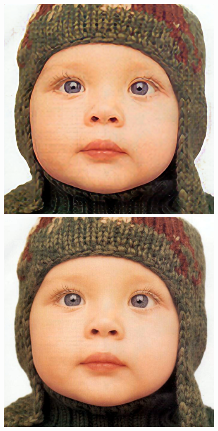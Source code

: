 \documentclass[runningheads]{llncs}
\begin{document}
\begin{figure}[t]
  \includegraphics[width=\mywidth]{set5_1_feat.png} \\
  \includegraphics[trim={100px 280px 300px 160px},width=\mywidth,clip]{set5_1_orig.png}

\end{figure}
\end{document}
